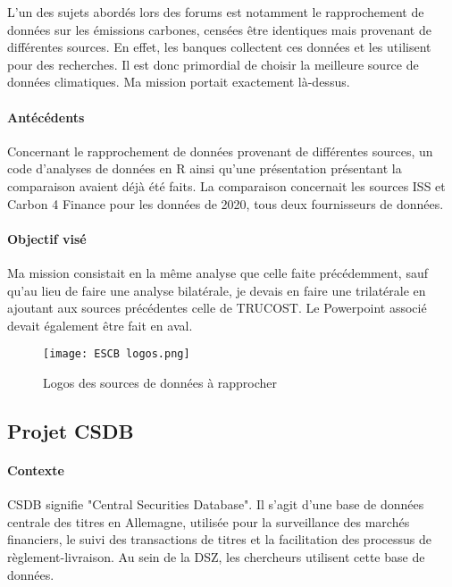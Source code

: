 L'un des sujets abordés lors des forums est notamment le rapprochement de données sur les émissions carbones, censées être identiques mais provenant de différentes sources.
En effet, les banques collectent ces données et les utilisent pour des recherches. Il est donc primordial de choisir la meilleure source de données climatiques.
Ma mission portait exactement là-dessus.

\paragraph{Antécédents}

Concernant le rapprochement de données provenant de différentes sources, un code d'analyses de données en R ainsi qu'une présentation présentant la comparaison avaient déjà été faits.
La comparaison concernait les sources ISS et Carbon 4 Finance pour les données de 2020, tous deux fournisseurs de données. 

\paragraph{Objectif visé}

Ma mission consistait en la même analyse que celle faite précédemment, sauf qu'au lieu de faire une analyse bilatérale, je devais en faire une trilatérale en ajoutant aux sources précédentes celle de TRUCOST.
Le Powerpoint associé devait également être fait en aval.

\begin{figure}[H]
    \centering
    \texttt{[image: ESCB logos.png]}
    \caption{Logos des sources de données à rapprocher}
\end{figure}

\pagebreak

\subsection{Projet CSDB}

\paragraph{Contexte}

CSDB signifie "Central Securities Database". Il s'agit d'une base de données centrale des titres en Allemagne, utilisée pour la surveillance des marchés financiers, le suivi des transactions de titres et la facilitation des processus de règlement-livraison.
Au sein de la DSZ, les chercheurs utilisent cette base de données.
\\

